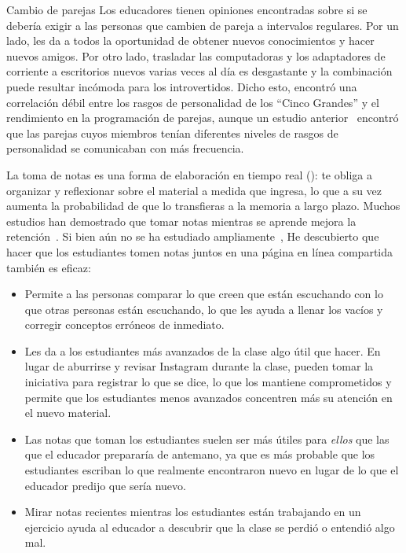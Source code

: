 \begin{aside}{Cambio de parejas}
  Los educadores tienen opiniones encontradas sobre si se debería exigir a las personas que cambien de pareja a intervalos regulares.
  Por un lado, les da a todos la oportunidad de obtener nuevos conocimientos y hacer nuevos amigos.
  Por otro lado,
  trasladar las computadoras y los adaptadores de corriente a escritorios nuevos varias veces al día es desgastante
  y la combinación puede resultar incómoda para los introvertidos.
  Dicho esto,
  \cite{Hann2010} encontró una correlación débil entre los rasgos de personalidad de los ``Cinco Grandes''
  y el rendimiento en la programación de parejas,
  aunque un estudio anterior~\cite{Wall2009} encontró que
  las parejas cuyos miembros tenían diferentes niveles de rasgos de personalidad se comunicaban con más frecuencia.
\end{aside}


La toma de notas es una forma de elaboración en tiempo real ():
te obliga a organizar y reflexionar sobre el material a medida que ingresa,
lo que a su vez aumenta la probabilidad de que lo transfieras a la memoria a largo plazo.
Muchos estudios han demostrado que
tomar notas mientras se aprende mejora la retención~\cite{Aike1975,Boha2011}.
Si bien aún no se ha estudiado ampliamente~\cite{Ornd2015,Yang2015},
He descubierto que hacer que los estudiantes tomen notas juntos en una página en línea compartida también es eficaz:

\begin{itemize}

\item
  Permite a las personas comparar lo que creen que están escuchando
  con lo que otras personas están escuchando,
  lo que les ayuda a llenar los vacíos y corregir conceptos erróneos de inmediato.
 
\item
  Les da a los estudiantes más avanzados de la clase algo útil que hacer.
  En lugar de aburrirse y revisar Instagram durante la clase,
  pueden tomar la iniciativa para registrar lo que se dice,
  lo que los mantiene comprometidos
  y permite que los estudiantes menos avanzados concentren más su atención en el nuevo material.
 
\item
  Las notas que toman los estudiantes suelen ser más útiles para \emph{ellos}
  que las que el educador prepararía de antemano,
  ya que es más probable que los estudiantes escriban lo que realmente encontraron nuevo
  en lugar de lo que el educador predijo que sería nuevo.

\item
  Mirar notas recientes mientras los estudiantes están trabajando en un ejercicio
  ayuda al educador a descubrir que la clase se perdió o entendió algo mal.
 
\end{itemize}

